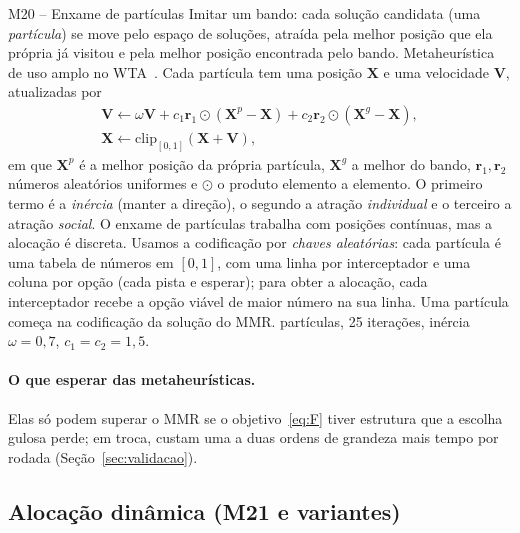 \begin{metodo}{M20 -- Enxame de partículas}
\ideia Imitar um bando: cada solução candidata (uma \emph{partícula}) se move pelo espaço de soluções, atraída pela melhor
posição que ela própria já visitou e pela melhor posição encontrada pelo bando.
\orig Metaheurística de uso amplo no WTA~\cite{kline2019}.
\func Cada partícula tem uma posição $\bm{X}$ e uma velocidade $\bm{V}$, atualizadas por
\begin{equation}
  \begin{gathered}
  \bm{V}\leftarrow\omega\bm{V}+c_1\bm{r}_1\odot(\bm{X}^{p}-\bm{X})+c_2\bm{r}_2\odot(\bm{X}^{g}-\bm{X}),\\
  \bm{X}\leftarrow\mathrm{clip}_{[0,1]}(\bm{X}+\bm{V}),
  \end{gathered}
\end{equation}
em que $\bm{X}^p$ é a melhor posição da própria partícula, $\bm{X}^g$ a melhor do bando, $\bm{r}_1,\bm{r}_2$ números
aleatórios uniformes e $\odot$ o produto elemento a elemento. O primeiro termo é a \emph{inércia} (manter a direção), o
segundo a atração \emph{individual} e o terceiro a atração \emph{social}.
\adap O enxame de partículas trabalha com posições contínuas, mas a alocação é discreta. Usamos a codificação por
\emph{chaves aleatórias}: cada partícula é uma tabela de números em $[0,1]$, com uma linha por interceptador e uma coluna
por opção (cada pista e esperar); para obter a alocação, cada interceptador recebe a opção viável de maior número na sua
linha. Uma partícula começa na codificação da solução do MMR.
 partículas, 25 iterações, inércia $\omega=0{,}7$, $c_1=c_2=1{,}5$.
\end{metodo}

\paragraph{O que esperar das metaheurísticas.} Elas só podem superar o MMR se o objetivo~\eqref{eq:F} tiver estrutura que
a escolha gulosa perde; em troca, custam uma a duas ordens de grandeza mais tempo por rodada
(Seção~\ref{sec:validacao}).

\subsection{Alocação dinâmica (M21 e variantes)}

